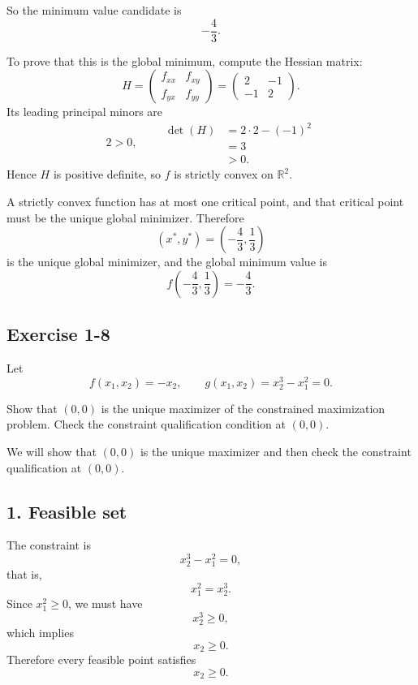 So the minimum value candidate is
\[
-\frac{4}{3}.
\]

To prove that this is the global minimum, compute the Hessian matrix:
\[
H=
\begin{pmatrix}
f_{xx} & f_{xy}\\
f_{yx} & f_{yy}
\end{pmatrix}
=
\begin{pmatrix}
2 & -1\\
-1 & 2
\end{pmatrix}.
\]
Its leading principal minors are
\[
2>0,
\qquad
\begin{aligned}
\det(H)
&=2\cdot 2-(-1)^2\\
&=3\\
&>0.
\end{aligned}
\]
Hence \(H\) is positive definite, so \(f\) is strictly convex on \(\mathbb{R}^2\).

A strictly convex function has at most one critical point, and that critical point must be the unique global minimizer. Therefore
\[
\boxed{
\left(x^*,y^*\right)=\left(-\frac{4}{3},\frac{1}{3}\right)
}
\]
is the unique global minimizer, and the global minimum value is
\[
\boxed{
f\left(-\frac{4}{3},\frac{1}{3}\right)=-\frac{4}{3}.
}
\]



\vspace{30pt}
\begin{tcolorbox}[breakable]
\subsection*{Exercise 1-8}

Let
\[
f(x_1,x_2) = -x_2,
\qquad
g(x_1,x_2)=x_2^3 - x_1^2=0.
\]

Show that $(0,0)$ is the unique maximizer of the constrained maximization problem.
Check the constraint qualification condition at $(0,0)$.

\end{tcolorbox}



We will show that \((0,0)\) is the unique maximizer and then check the constraint qualification at \((0,0)\).

\subsection*{1. Feasible set}

The constraint is
\[
x_2^3-x_1^2=0,
\]
that is,
\[
x_1^2=x_2^3.
\]
Since \(x_1^2\ge 0\), we must have
\[
x_2^3\ge 0,
\]
which implies
\[
x_2\ge 0.
\]
Therefore every feasible point satisfies
\[
x_2\ge 0.
\]

